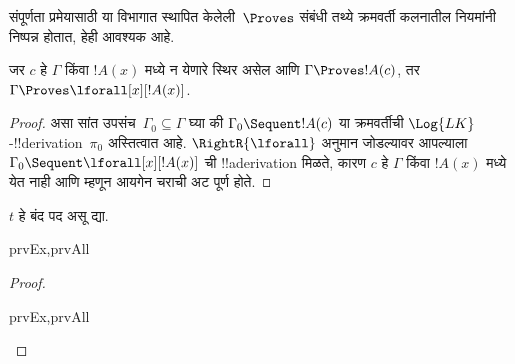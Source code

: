 \documentclass[../../../include/open-logic-section]{subfiles}
\begin{document}

\begin{explain}
  संपूर्णता प्रमेयासाठी या विभागात स्थापित केलेली~$\Proves$ संबंधी तथ्ये
  क्रमवर्ती कलनातील नियमांनी निष्पन्न होतात, हेही आवश्यक आहे.
\end{explain}

\begin{thm}
 जर $c$ हे $\Gamma$ किंवा $!A(x)$ मध्ये
न येणारे स्थिर असेल आणि $\Gamma \Proves !A(c)$, तर $\Gamma
\Proves \lforall[x][!A(x)]$.
\end{thm}

\begin{proof}
असा सांत उपसंच~$\Gamma_0 \subseteq \Gamma$ घ्या की
$\Gamma_0 \Sequent !A(c)$ या क्रमवर्तीची $\Log{LK}$-!!{derivation}~$\pi_0$
अस्तित्वात आहे.  $\RightR{\lforall}$
अनुमान जोडल्यावर आपल्याला $\Gamma_0 \Sequent
\lforall[x][!A(x)]$ ची !!a{derivation} मिळते, कारण $c$ हे $\Gamma$ किंवा
$!A(x)$ मध्ये येत नाही आणि म्हणून आयगेन चराची अट पूर्ण होते.
\end{proof}

\begin{prop}
$t$ हे बंद पद असू द्या.
\begin{tagenumerate}{prvEx,prvAll}
\end{tagenumerate}
\end{prop}

\begin{proof}
\begin{tagenumerate}{prvEx,prvAll}
\end{tagenumerate}
\end{proof}
\end{document}
